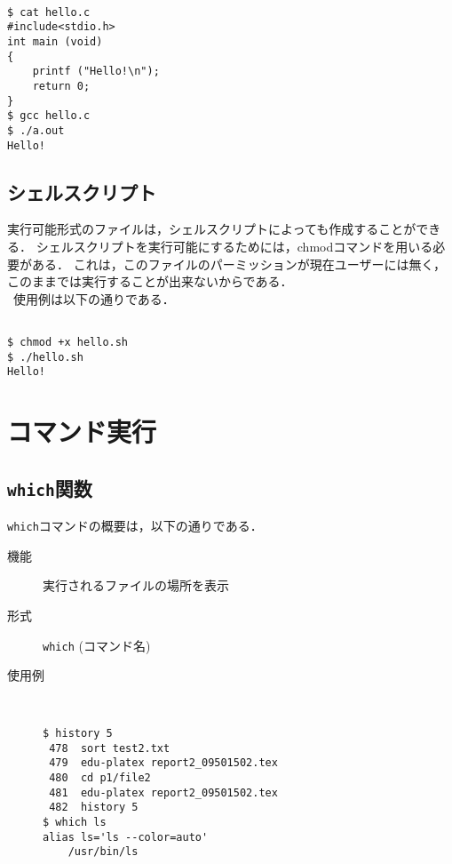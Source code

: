 \documentclass[a4j,11pt]{jarticle}
\begin{document}
\begin{verbatim}

$ cat hello.c
#include<stdio.h>
int main (void)
{
    printf ("Hello!\n");
    return 0;
}
$ gcc hello.c
$ ./a.out
Hello!

\end{verbatim}

\subsection{シェルスクリプト}

実行可能形式のファイルは，シェルスクリプトによっても作成することができる．
シェルスクリプトを実行可能にするためには，chmodコマンドを用いる必要がある．
これは，このファイルのパーミッションが現在ユーザーには無く，このままでは実行することが出来ないからである．\\
\ 使用例は以下の通りである．

\begin{verbatim}

$ chmod +x hello.sh
$ ./hello.sh
Hello!

\end{verbatim}



\section{コマンド実行} %

\subsection{\texttt{which}関数}

\verb|which|コマンドの概要は，以下の通りである．
\begin{description}
  \item[機能]
    実行されるファイルの場所を表示
  \item[形式]
    \verb|which| (コマンド名)
  \item[使用例]
    \begin{verbatim}


$ history 5
 478  sort test2.txt
 479  edu-platex report2_09501502.tex
 480  cd p1/file2
 481  edu-platex report2_09501502.tex
 482  history 5
$ which ls
alias ls='ls --color=auto'
	/usr/bin/ls

    \end{verbatim}
\end{description}
\end{document}
